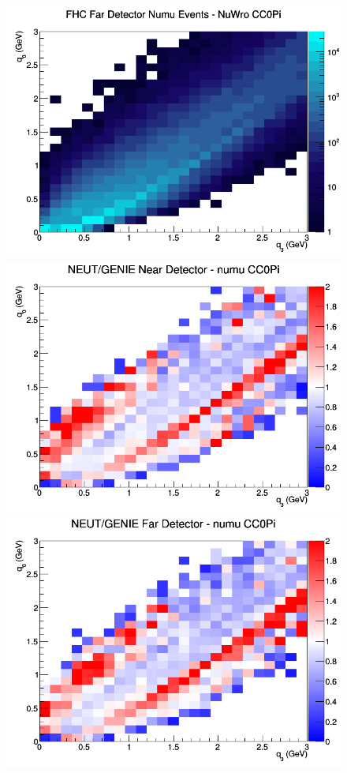 \begin{figure}[h]
\endminipage
{}
\includegraphics[width=\linewidth]{eff_q0_q3/LAr/CC0Pi_FHC_FD_numu_q3_q0_NuWro.png}
\endminipage
\newline
{}
\includegraphics[width=\linewidth]{eff_q0_q3/LAr/ratios/CC0Pi_NEUT_GENIE_numu_near_q3_q0.png}
\endminipage
{}
\includegraphics[width=\linewidth]{eff_q0_q3/LAr/ratios/CC0Pi_NEUT_GENIE_numu_far_q3_q0.png}

\end{figure}
